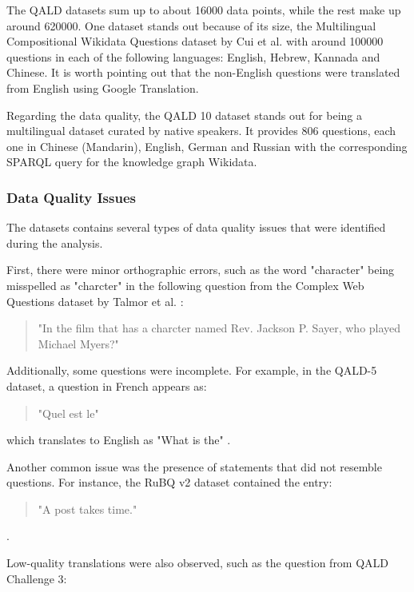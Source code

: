 The QALD datasets sum up to about 16000 data points, while the rest make up around 620000. One dataset stands out because of its size, the Multilingual Compositional Wikidata Questions dataset by Cui et al. \cite{2021arXiv210803509C} with around 100000 questions in each of the following languages: English, Hebrew, Kannada and Chinese. It is worth pointing out that the non-English questions were translated from English using Google Translation.

Regarding the data quality, the QALD 10 dataset stands out for being a multilingual dataset curated by native speakers. It provides 806 questions, each one in Chinese (Mandarin), English, German and Russian with the corresponding SPARQL query for the knowledge graph Wikidata.

\subsubsection{Data Quality Issues}
The datasets contains several types of data quality issues that were identified during the analysis.

First, there were minor orthographic errors, such as the word "character" being misspelled as "charcter" in the following question from the Complex Web Questions dataset by Talmor et al. \cite{Talmor2018TheWA}:

\begin{quote}
"In the film that has a charcter named Rev. Jackson P. Sayer, who played Michael Myers?"
\end{quote}

Additionally, some questions were incomplete. For example, in the QALD-5 dataset, a question in French appears as:

\begin{quote}
"Quel est le"
\end{quote}

which translates to English as "What is the" \cite{DBLP:conf/clef/UngerFLNCCW15}.

Another common issue was the presence of statements that did not resemble questions. For instance, the RuBQ v2 dataset contained the entry:

\begin{quote}
"A post takes time."
\end{quote}

\cite{rybin2021rubq}.

Low-quality translations were also observed, such as the question from QALD Challenge 3:

